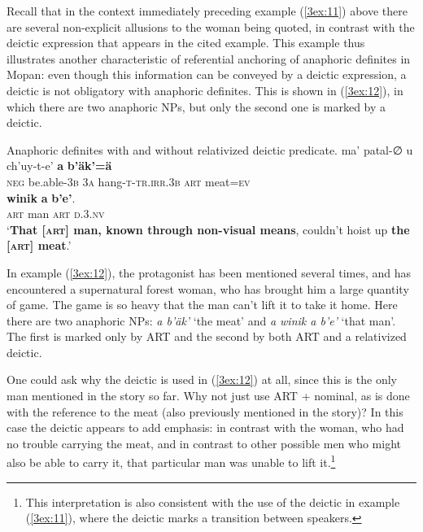 \documentclass[output=paper]{langsci/langscibook}
\begin{document}
\label{3sec:3121}

\largerpage[-1]
Recall that in the context immediately preceding example (\ref{3ex:11}) above there are several non-explicit allusions to the woman being quoted, in contrast with the deictic expression that appears in the cited example. This example thus illustrates another characteristic of referential anchoring of anaphoric definites in Mopan: even though this information can be conveyed by a deictic expression, a deictic is not obligatory with anaphoric definites. This is shown in (\ref{3ex:12}), in which there are two anaphoric NPs, but only the second one is marked by a deictic.

\begin{exe}
\ex\label{3ex:12}
Anaphoric definites with and without relativized deictic predicate. 
\exi{}
\gll	ma'			patal-{∅}		u		ch'uy-t-e'			{\textbf{a}}	{\textbf{b'\"ak'=\"a}} \\
	{\textsc{neg}}	be.able-{\textsc{3b}}	{\textsc{3a}}	hang-{\textsc{t-tr.irr.3b}}	{\textsc{art}}	meat{\textsc{=ev}} \\
\glt
\exi{} 
	{\textbf{winik}}		{\textbf{a}}	{\textbf{b'e'}}. \\
	{\textsc{art}}	man			{\textsc{art}}	{\textsc{d.3.nv}} \\
\glt	`{\textbf{That [{\textsc{art}}] man, known through non-visual means}}, couldn't hoist up {\textbf{the [{\textsc{art}}] meat}}.'
\end{exe}

In example (\ref{3ex:12}), the protagonist has been mentioned several times, and has encountered a supernatural forest woman, who has brought him a large quantity of game.  The game is so heavy that the man can't lift it to take it home.  Here there are two anaphoric NPs:  {\emph{a b'\"ak'}} `the meat' and {\emph{a winik a b'e'}} `that man'.  The first is marked only by ART and the second by both ART and a relativized deictic.

One could ask why the deictic is used in (\ref{3ex:12}) at all, since this is the only man mentioned in the story so far.  Why not just use ART + nominal, as is done with the reference to the meat (also previously mentioned in the story)?  In this case the deictic appears to add emphasis:  in contrast with the woman, who had no trouble carrying the meat, and in contrast to other possible men who might also be able to carry it, that particular man was unable to lift it.\footnote{This interpretation is also consistent with the use of the deictic in example (\ref{3ex:11}), where the deictic marks a transition between speakers.} 
\end{document}

